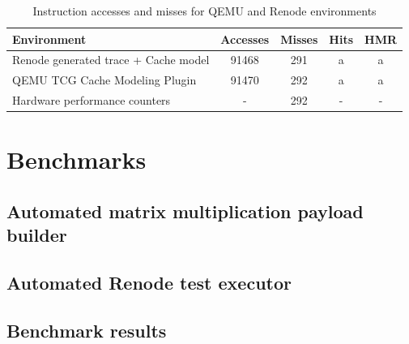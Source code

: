 \begin{center}
\begin{table}[h!]
\centering
\begin{tabular}{|l|c|c|c|c|}
\hline
\textbf{Environment} & \textbf{Accesses} & \textbf{Misses} & \textbf{Hits} & \textbf{HMR} \\ \hline
Renode generated trace + Cache model    & 91468        & 291         & a & a\\ \hline
QEMU TCG Cache Modeling Plugin          & 91470        & 292         & a & a\\ \hline
Hardware performance counters          & -        & 292         & - & -\\ \hline
\end{tabular}
\caption{Instruction accesses and misses for QEMU and Renode environments}
\label{table:cache_results}
\end{table}
\end{center}

\section{Benchmarks}
\subsection{Automated matrix multiplication payload builder}
\subsection{Automated Renode test executor}
\subsection{Benchmark results}
